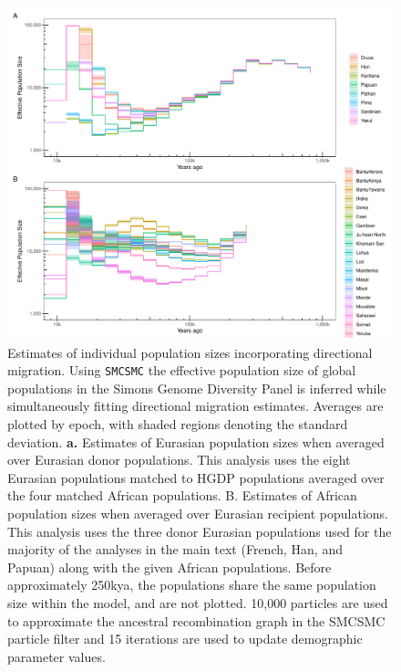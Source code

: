 \begin{figure}
  \centering
  \includegraphics[width=\textwidth]{plot/individual_populations_averaged.pdf}
  \caption[Individual population size inferences with SMCSMC]{Estimates of individual population sizes incorporating directional migration. Using {\tt SMCSMC} the effective population size of global populations in the Simons Genome Diversity Panel is inferred while simultaneously fitting directional migration estimates. Averages are plotted by epoch, with shaded regions denoting the standard deviation. {\bf a.} Estimates of Eurasian population sizes when averaged over Eurasian donor populations. This analysis uses the eight Eurasian populations matched to HGDP populations averaged over the four matched African populations. B. Estimates of African population sizes when averaged over Eurasian recipient populations. This analysis uses the three donor Eurasian populations used for the majority of the analyses in the main text (French, Han, and Papuan) along with the given African populations. Before approximately 250kya, the populations share the same population size within the model, and are not plotted. 10,000 particles are used to approximate the ancestral recombination graph in the SMCSMC particle filter and 15 iterations are used to update demographic parameter values. }
  \label{fig:individual_pop_sizes}
\end{figure}
\newpage



